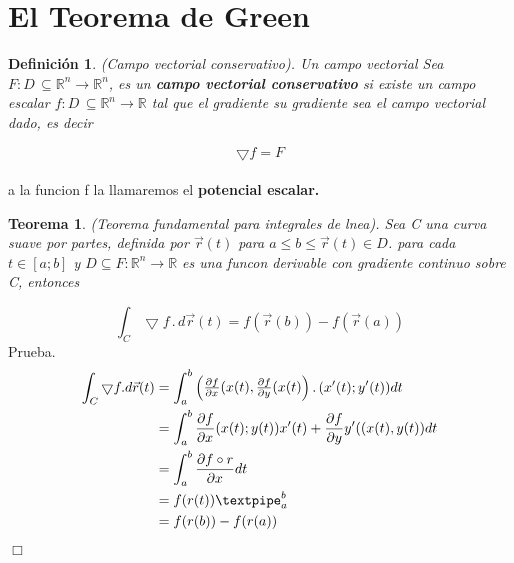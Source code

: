 \documentclass[11pt]{book}
\newcounter{Teorema}
\numberwithin{equation}{section}
\theoremstyle{plain}  %
\newtheorem{thm}{Teorema}[section]
\newtheorem{Def}{Definición}[chapter]
\begin{document}
	\section{El Teorema de Green}
{\it 
	\begin{Def}
		(Campo vectorial conservativo). Un campo vectorial Sea $F:D \,\subseteq \mathbb{R}^{n} \to \mathbb{R}^{n}$, es un \textbf{campo vectorial conservativo} si existe un campo escalar $f:D \, \subseteq \mathbb{R}^{n} \to \mathbb{R}$ tal que el gradiente su gradiente sea el campo vectorial dado, es decir
	\end{Def}
\begin{equation*}
		\bigtriangledown f = F
\end{equation*}
\\
	\noindent a la funcion f la llamaremos el \textbf{potencial escalar.} 
\begin{thm} (Teorema fundamental para integrales de lnea). Sea C una curva suave por partes, definida por $\vec{r}(t)$	 para $a \leq b\leq \vec{r}(t)\in D$. para cada $t \in [a; b]$  y $ D \subseteq F: \mathbb{R}^{n} \to \mathbb{R}$ es una funcon derivable con gradiente continuo sobre C, entonces
		\end{thm}
	\begin{equation*}
			\int_{C} \bigtriangledown f \,.\,d\vec{r} (t) = f(\vec{r}(b)) - f(\vec{r}(a))
	\end{equation*}
	\newpage
	\noindent Prueba.
		\begin{align*}
		\int_{C} \bigtriangledown f.d\vec{r} (t) &= \int_{a}^{b} 
		\begin{pmatrix}					
			\frac{\partial f}{\partial x_{}} (x(t), 	\frac{\partial f}{\partial y_{}} (x(t) \end{pmatrix}.\, (x'(t); y'(t)) dt \\		
		&=  \int_{a}^{b} 				
		\frac{\partial f}{\partial x_{}} (x(t); y(t)) 	x'(t) +	\frac{\partial f}{\partial y_{}}y'((x(t), y(t))dt \\
		&= 	\int_{a}^{b}\frac{\partial f \circ r}{\partial x_{}}dt \\
			&= f(r(t)) \textpipe_{a}^{b}\\
		&= f(r(b))- f(r(a))  \\ 
	    \end{align*}
	\begin{flushright}
			$\Box$
	\end{flushright}
	
}
\end{document}
